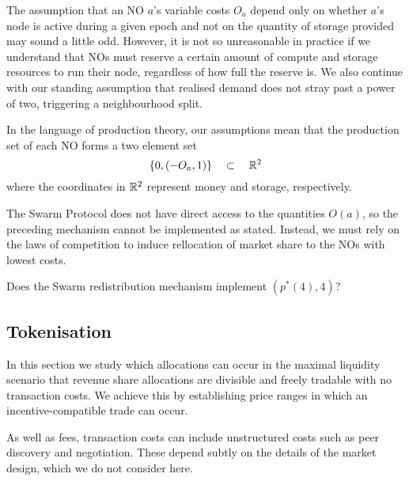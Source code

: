 \begin{remark}

  The assumption that an NO $a$'s variable costs $O_a$ depend only on whether $a$'s node is active during a given epoch and not on the quantity of storage provided may sound a little odd.
  However, it is not so unreasonable in practice if we understand that NOs must reserve a certain amount of compute and storage resources to run their node, regardless of how full the reserve is.
  We also continue with our standing assumption that realised demand does not stray past a power of two, triggering a neighbourhood split.

  In the language of production theory, our assumptions mean that the production set of each NO forms a two element set
  \[
    \{0, (-O_a,1) \} \quad \subset \quad \mathbb{R}^2
  \]
  where the coordinates in $\mathbb{R}^2$ represent money and storage, respectively.

\end{remark}

The Swarm Protocol does not have direct access to the quantities $O(a)$, so the preceding mechanism cannot be implemented as stated.
%
Instead, we must rely on the laws of competition to induce rellocation of market share to the NOs with lowest costs.

\begin{question} Does the Swarm redistribution mechanism implement $(p^*(4),4)$? \end{question}










\subsection{Tokenisation}

In this section we study which allocations can occur in the maximal liquidity scenario that revenue share allocations are divisible and freely tradable with no transaction costs.
%
We achieve this by establishing price ranges in which an incentive-compatible trade can occur.

\begin{remark}

  As well as fees, transaction costs can include unstructured costs such as peer discovery and negotiation.
  These depend subtly on the details of the market design, which we do not consider here.

\end{remark}

